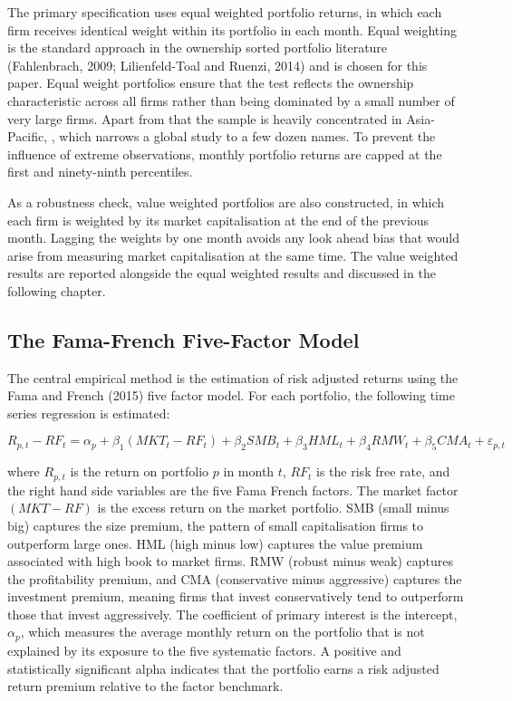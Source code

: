 The primary specification uses equal weighted portfolio returns, in which each firm receives identical weight within its portfolio in each month. Equal weighting is the standard approach in the ownership sorted portfolio literature (Fahlenbrach, 2009; Lilienfeld-Toal and Ruenzi, 2014) and is chosen for this paper. Equal weight portfolios ensure that the test reflects the ownership characteristic across all firms rather than being dominated by a small number of very large firms. Apart from that the sample is heavily concentrated in Asia-Pacific, , which narrows a global study to a few dozen names. To prevent the influence of extreme observations, monthly portfolio returns are capped at the first and ninety-ninth percentiles.

As a robustness check, value weighted portfolios are also constructed, in which each firm is weighted by its market capitalisation at the end of the previous month. Lagging the weights by one month avoids any look ahead bias that would arise from measuring market capitalisation at the same time. The value weighted results are reported alongside the equal weighted results and discussed in the following chapter.

\subsection{The Fama-French Five-Factor Model} 

The central empirical method is the estimation of risk adjusted returns using the Fama and French (2015) five factor model. For each portfolio, the following time series regression is estimated:

\[
R_{p,t} - RF_t = \alpha_p + \beta_1 (MKT_t - RF_t) + \beta_2 SMB_t + \beta_3 HML_t + \beta_4 RMW_t + \beta_5 CMA_t + \varepsilon_{p,t}
\]

where $R_{p,t}$ is the return on portfolio $p$ in month $t$, $RF_t$ is the risk free rate, and the right hand side variables are the five Fama French factors. The market factor $(MKT - RF)$ is the excess return on the market portfolio. SMB (small minus big) captures the size premium, the pattern of small capitalisation firms to outperform large ones. HML (high minus low) captures the value premium associated with high book to market firms. RMW (robust minus weak) captures the profitability premium, and CMA (conservative minus aggressive) captures the investment premium, meaning firms that invest conservatively tend to outperform those that invest aggressively. The coefficient of primary interest is the intercept, $\alpha_p$, which measures the average monthly return on the portfolio that is not explained by its exposure to the five systematic factors. A positive and statistically significant alpha indicates that the portfolio earns a risk adjusted return premium relative to the factor benchmark.

